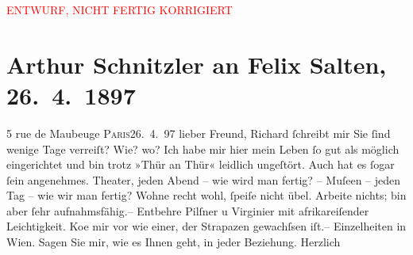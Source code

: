 
\begin{center}
            \textcolor{red}{ENTWURF, NICHT FERTIG KORRIGIERT}
                      \end{center}
            
         
         \renewcommand{\erwaehntePersonen}{Personen: Richard Beer-Hofmann, Felix Salten}
         \renewcommand{\erwaehnteOrte}{Orte: Paris, Wien, rue de Maubeuge}
         \renewcommand{\erwaehnteWerke}{}
               \section[Arthur Schnitzler an Felix Salten, 26. 4. 1897]{ Arthur Schnitzler an Felix Salten, 26. 4. 1897}\nopagebreak{}\rehead{ }\begin{ledgroupsized}[t]{13cm}\normalsize\beginnumbering \toendnotes[C]{\smallbreak\pagebreak[2]} 
\pstart
           \noindent{}\raggedleft{}{\pb}5 rue de Maubeuge\pend
           \pstart
           \raggedleft{}\textsc{Paris26. 4. 97}\pend
           \pstart{}lieber Freund,\pend\pstart
           Richard ſchreibt mir Sie ſind wenige Tage
               verreiſt? Wie? wo? Ich habe mir hier mein Leben ſo gut als möglich eingerichtet und
               bin trotz »Thür an Thür« leidlich {\pb}ungeſtört.
               Auch hat es ſogar ſein angenehmes. Theater, jeden Abend – wie wird man fertig? –
               Muſeen – jeden Tag – wie wir man fertig? Wohne recht wohl, ſpeiſe nicht übel. Arbeite
               nichts; bin aber ſehr aufnahmsfähig.– {\pb}Entbehre Pilſner u Virginier mit afrikareiſender Leichtigkeit. Ko{\geminationm}e mir vor wie einer, der Strapazen gewachſsen iſt.– \pend
           \pstart
           Einzelheiten in Wien. \pend
           \pstart
           Sagen Sie mir, wie es Ihnen geht, in jeder Beziehung. Herzlich \pend
           
         
         \endnumbering{}\end{ledgroupsized}\begin{anhang}\end{anhang}\newcommand{\dateiname}{L02963}\newcommand{\titel}{Arthur Schnitzler an Felix Salten, 26. 4. 1897}\newcommand{\editorInnen}{Martin Anton Müller und Laura Untner}
      
